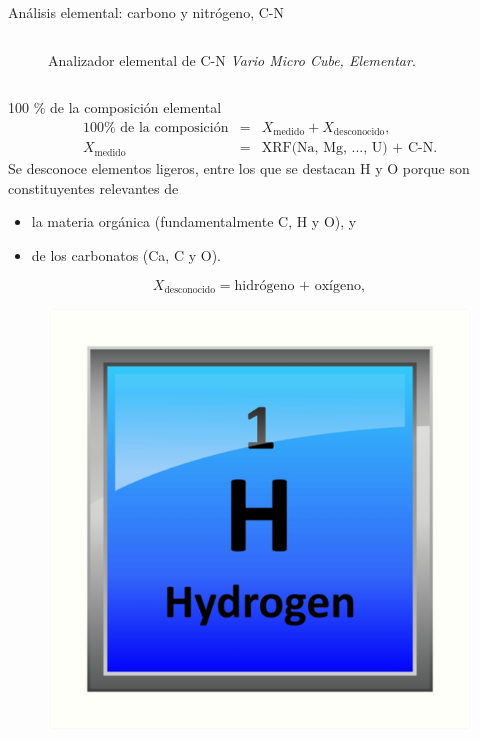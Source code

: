 \documentclass[9pt]{beamer}
\begin{document}
\begin{frame}{Análisis elemental: carbono y nitrógeno, C-N}
\begin{columns}
\begin{column}{0.3\textwidth}
\begin{figure}
			\caption{\justifying Analizador elemental de C-N \textit{Vario Micro Cube, Elementar}.}
		\end{figure}
		\end{column}
	\end{columns}
\end{frame}

\begin{frame}{100 \% de la composición elemental}
	\justifying
	\begin{eqnarray}
		100 \% \text{ de la composición}	&=& X_\text{medido} + X_\text{desconocido}, \\
		X_\text{medido} 			&=& \text{XRF(Na, Mg, ..., U) + C-N.} 
	\end{eqnarray}
	Se desconoce elementos ligeros, entre los que se destacan H y O porque 	
	son constituyentes relevantes de
\begin{itemize}
\item la materia orgánica (fundamentalmente C, H y O), y
\item de los carbonatos (Ca, C y O). 
\end{itemize}	
	\begin{equation}
		 X_\text{desconocido} = \text{hidrógeno + oxígeno},
	\end{equation}
	\begin{figure}
		\includegraphics[height=0.15\textheight]{Imagenes/Hidrogeno.png}

\end{figure}
\end{frame}
\end{document}

